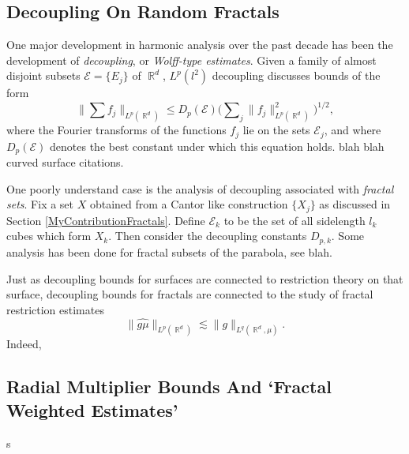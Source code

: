 \documentclass[11pt]{article}
\DeclareMathOperator{\RR}{\mathbb{R}}
\begin{document}
\subsection{Decoupling On Random Fractals}

One major development in harmonic analysis over the past decade has been the development of \emph{decoupling}, or \emph{Wolff-type estimates}. Given a family of almost disjoint subsets $\mathcal{E} = \{ E_j \}$ of $\RR^d$, $L^p(l^2)$ decoupling discusses bounds of the form
%
\[ \Big\| \sum f_j \Big\|_{L^p(\RR^d)} \leq D_p(\mathcal{E}) \Big( \sum\nolimits_j \| f_j \|_{L^p(\RR^d)}^2 \Big)^{1/2}, \]
%
where the Fourier transforms of the functions $f_j$ lie on the sets $\mathcal{E}_j$, and where $D_p(\mathcal{E})$ denotes the best constant under which this equation holds. blah blah curved surface citations.

One poorly understand case is the analysis of decoupling associated with \emph{fractal sets}. Fix a set $X$ obtained from a Cantor like construction $\{ X_j \}$ as discussed in Section \ref{MyContributionFractals}. Define $\mathcal{E}_k$ to be the set of all sidelength $l_k$ cubes which form $X_k$. Then consider the decoupling constants $D_{p,k}$. Some analysis has been done for fractal subsets of the parabola, see blah.

Just as decoupling bounds for surfaces are connected to restriction theory on that surface, decoupling bounds for fractals are connected to the study of fractal restriction estimates
%
\[ \| \widehat{g \mu} \|_{L^p(\RR^d)} \lesssim \| g \|_{L^q(\RR^d, \mu)}. \]
%
Indeed, 

\subsection{Radial Multiplier Bounds And `Fractal Weighted Estimates'}

s
\end{document}
